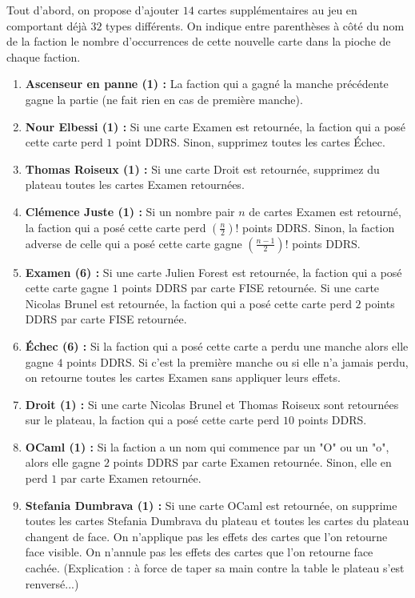 \documentclass[12pt, openany]{report}
\begin{document}
	Tout d'abord, on propose d'ajouter $14$ cartes supplémentaires au jeu en comportant déjà $32$ types différents. On indique entre parenthèses à côté du nom de la faction le nombre d'occurrences de cette nouvelle carte dans la pioche de chaque faction. 
	\begin{enumerate}
		\item \textbf{Ascenseur en panne (1) :}
		La faction qui a gagné la manche précédente gagne la partie (ne fait rien en cas de première manche).
		\item \textbf{Nour Elbessi (1) :}
		Si une carte Examen est retournée, la faction qui a posé cette carte perd $1$ point DDRS. Sinon, supprimez toutes les cartes Échec.
		\item \textbf{Thomas Roiseux (1) :}
		Si une carte Droit est retournée, supprimez du plateau toutes les cartes Examen retournées.
		\item \textbf{Clémence Juste (1) :}
		Si un nombre pair $n$ de cartes Examen est retourné, la faction qui a posé cette carte perd $(\frac{n}{2})!$ points DDRS. Sinon, la faction adverse de celle qui a posé cette carte gagne $(\frac{n-1}{2})!$ points DDRS.
		\item \textbf{Examen (6) :}
		Si une carte Julien Forest est retournée, la faction qui a posé cette carte gagne $1$ points DDRS par carte FISE retournée. Si une carte Nicolas Brunel est retournée, la faction qui a posé cette carte perd $2$ points DDRS par carte FISE retournée.
		\item \textbf{Échec (6) :}
		Si la faction qui a posé cette carte a perdu une manche alors elle gagne $4$ points DDRS. Si c'est la première manche ou si elle n'a jamais perdu, on retourne toutes les cartes Examen sans appliquer leurs effets.
		\item \textbf{Droit (1) :}
		Si une carte Nicolas Brunel et Thomas Roiseux sont retournées sur le plateau, la faction qui a posé cette carte perd $10$ points DDRS.
		\item \textbf{OCaml (1) :}
		Si la faction a un nom qui commence par un "O" ou un "o", alors elle gagne $2$ points DDRS par carte Examen retournée. Sinon, elle en perd $1$ par carte Examen retournée.
		\item \textbf{Stefania Dumbrava (1) :}
		Si une carte OCaml est retournée, on supprime toutes les cartes Stefania Dumbrava du plateau et toutes les cartes du plateau changent de face. On n'applique pas les effets des cartes que l'on retourne face visible. On n'annule pas les effets des cartes que l'on retourne face cachée. (Explication : à force de taper sa main contre la table le plateau s'est renversé...)

\end{enumerate}
\end{document}
